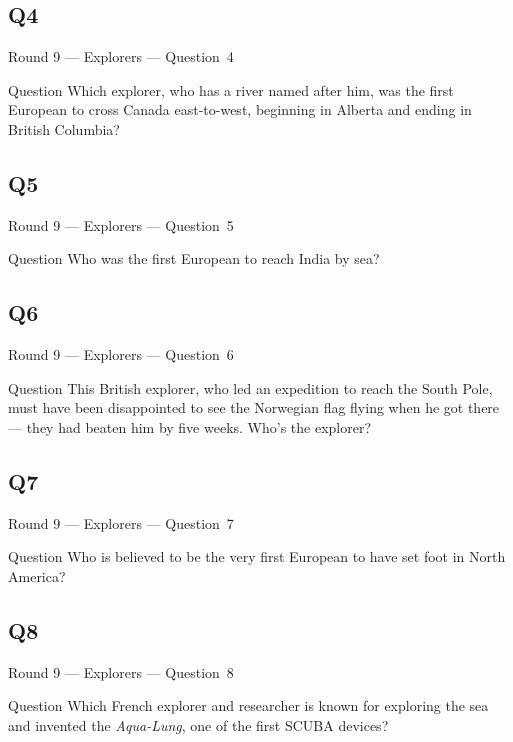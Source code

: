 \documentclass[11pt]{beamer}
\begin{document}
\subsection*{Q4}
\begin{frame}[t]{Round 9 --- Explorers --- \mbox{Question 4}}
\begin{block}{Question}
Which explorer, who has a river named after him, was the first European to cross Canada east-to-west, beginning in Alberta and ending in British Columbia?
\end{block}
\end{frame}
\subsection*{Q5}
\begin{frame}[t]{Round 9 --- Explorers --- \mbox{Question 5}}
\begin{block}{Question}
Who was the first European to reach India by sea?
\end{block}
\end{frame}
\subsection*{Q6}
\begin{frame}[t]{Round 9 --- Explorers --- \mbox{Question 6}}
\begin{block}{Question}
This British explorer, who led an expedition to reach the South Pole, must have been disappointed to see the Norwegian flag flying when he got there --- they had beaten him by five weeks. Who's the explorer?
\end{block}
\end{frame}
\subsection*{Q7}
\begin{frame}[t]{Round 9 --- Explorers --- \mbox{Question 7}}
\begin{block}{Question}
Who is believed to be the very first European to have set foot in North America?
\end{block}
\end{frame}
\subsection*{Q8}
\begin{frame}[t]{Round 9 --- Explorers --- \mbox{Question 8}}
\begin{block}{Question}
Which French explorer and researcher is known for exploring the sea and invented the \emph{Aqua-Lung}, one of the first SCUBA devices?
\end{block}
\end{frame}
\end{document}
